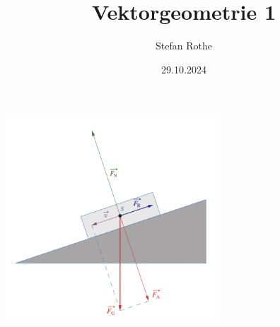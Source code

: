 \documentclass[parskip=half]{scrartcl}
\title{Vektorgeometrie 1}
\author{Stefan Rothe}
\date{29.10.2024}
\begin{document}
  \maketitle
  \thispagestyle{firstpage}
  \begin{center}
    \includegraphics[width=0.6\textwidth]{title.png}
  \end{center}
  \tableofcontents
  \newpage
  
  
  
  
  
\end{document}
